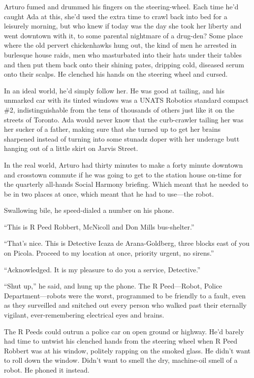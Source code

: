 Arturo fumed and drummed his fingers on the steering-wheel. Each
time he’d caught Ada at this, she’d used the extra time to crawl
back into bed for a leisurely morning, but who knew if today was
the day she took her liberty and went downtown with it, to some
parental nightmare of a drug-den? Some place where the old pervert
chickenhawks hung out, the kind of men he arrested in burlesque
house raids, men who masturbated into their hats under their tables
and then put them back onto their shining pates, dripping cold,
diseased serum onto their scalps. He clenched his hands on the
steering wheel and cursed.

In an ideal world, he’d simply follow her. He was good at tailing,
and his unmarked car with its tinted windows was a UNATS Robotics
standard compact \#2, indistinguishable from the tens of thousands
of others just like it on the streets of Toronto. Ada would never
know that the curb-crawler tailing her was her sucker of a father,
making sure that she turned up to get her brains sharpened instead
of turning into some stunadz doper with her underage butt hanging
out of a little skirt on Jarvis Street.

In the real world, Arturo had thirty minutes to make a forty minute
downtown and crosstown commute if he was going to get to the
station house on-time for the quarterly all-hands Social Harmony
briefing. Which meant that he needed to be in two places at once,
which meant that he had to use—the robot.

Swallowing bile, he speed-dialed a number on his phone.

“This is R Peed Robbert, McNicoll and Don Mills bus-shelter.”

“That’s nice. This is Detective Icaza de Arana-Goldberg, three
blocks east of you on Picola. Proceed to my location at once,
priority urgent, no sirens.”

“Acknowledged. It is my pleasure to do you a service, Detective.”

“Shut up,” he said, and hung up the phone. The R Peed—Robot, Police
Department—robots were the worst, programmed to be friendly to a
fault, even as they surveilled and snitched out every person who
walked past their eternally vigilant, ever-remembering electrical
eyes and brains.

The R Peeds could outrun a police car on open ground or highway.
He’d barely had time to untwist his clenched hands from the
steering wheel when R Peed Robbert was at his window, politely
rapping on the smoked glass. He didn’t want to roll down the
window. Didn’t want to smell the dry, machine-oil smell of a robot.
He phoned it instead.

